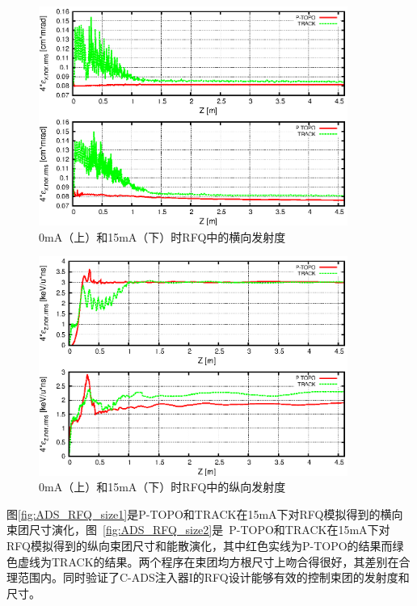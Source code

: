 \begin{figure}[!htb]
    \centering
    \includegraphics[width=0.9\textwidth]{Img/ADS_RFQ_emit1.eps}
    \caption{0mA（上）和15mA（下）时RFQ中的横向发射度}
    \label{fig:ADS_RFQ_emit_transverse}
\end{figure}
\begin{figure}[b]
    \centering
    \includegraphics[width=0.9\textwidth]{Img/ADS_RFQ_emit2.eps}
    \caption{0mA（上）和15mA（下）时RFQ中的纵向发射度}
    \label{fig:ADS_RFQ_emit_longitudinal}
\end{figure}


图\ref{fig:ADS_RFQ_size1}是P-TOPO和TRACK在15mA下对RFQ模拟得到的横向束团尺寸演化，图~\ref{fig:ADS_RFQ_size2}是~P-TOPO和TRACK在15mA下对RFQ模拟得到的纵向束团尺寸和能散演化，其中红色实线为P-TOPO的结果而绿色虚线为TRACK的结果。两个程序在束团均方根尺寸上吻合得很好，其差别在合理范围内。同时验证了C-ADS注入器I的RFQ设计能够有效的控制束团的发射度和尺寸。

